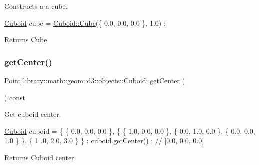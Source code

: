 Constructs a a cube. 


\begin{DoxyCode}
\hyperlink{classlibrary_1_1math_1_1geom_1_1d3_1_1objects_1_1_cuboid_ac42299f962fab284a76a46d4ea4e6fa2}{Cuboid} cube = \hyperlink{classlibrary_1_1math_1_1geom_1_1d3_1_1objects_1_1_cuboid_ac13abaa04f53ab22888ea6c0f697fbc8}{Cuboid::Cube}(\{ 0.0, 0.0, 0.0 \}, 1.0) ;
\end{DoxyCode}


\begin{DoxyReturn}{Returns}
Cube 
\end{DoxyReturn}
\mbox{\label{classlibrary_1_1math_1_1geom_1_1d3_1_1objects_1_1_cuboid_a39e45db60ac6c6662235c94f16d0e3ea}} 
\subsubsection{\texorpdfstring{get\+Center()}{getCenter()}}
{\footnotesize\ttfamily \hyperlink{classlibrary_1_1math_1_1geom_1_1d3_1_1objects_1_1_point}{Point} library\+::math\+::geom\+::d3\+::objects\+::\+Cuboid\+::get\+Center (\begin{DoxyParamCaption}{ }\end{DoxyParamCaption}) const}



Get cuboid center. 


\begin{DoxyCode}
\hyperlink{classlibrary_1_1math_1_1geom_1_1d3_1_1objects_1_1_cuboid_ac42299f962fab284a76a46d4ea4e6fa2}{Cuboid} cuboid = \{ \{ 0.0, 0.0, 0.0 \}, \{ \{ 1.0, 0.0, 0.0 \}, \{ 0.0, 1.0, 0.0 \}, \{ 0.0, 0.0, 1.0 \} \}, \{ 1
      .0, 2.0, 3.0 \} \} ;
cuboid.getCenter() ; \textcolor{comment}{// [0.0, 0.0, 0.0]}
\end{DoxyCode}


\begin{DoxyReturn}{Returns}
\hyperlink{classlibrary_1_1math_1_1geom_1_1d3_1_1objects_1_1_cuboid}{Cuboid} center 
\end{DoxyReturn}
\mbox{\label{classlibrary_1_1math_1_1geom_1_1d3_1_1objects_1_1_cuboid_a39291966f74c9fad884e80c71f30c8b3}} 
